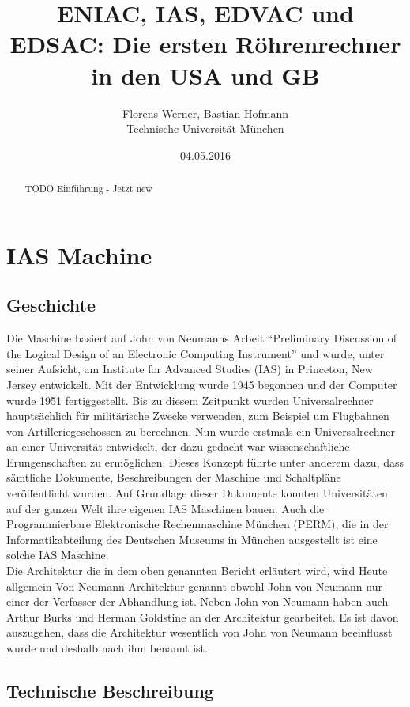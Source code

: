 \documentclass[12pt]{report}
\author{Florens Werner, Bastian Hofmann \\ Technische Universität München}
\title{ENIAC, IAS, EDVAC und EDSAC: Die ersten Röhrenrechner in den USA und GB}
\date{04.05.2016}
\begin{document}
\maketitle

\begin{abstract}
TODO Einführung - Jetzt new
\end{abstract}

\section{IAS Machine}

\subsection{Geschichte}


Die Maschine basiert auf John von Neumanns Arbeit ``Preliminary Discussion of the
Logical Design of an Electronic Computing Instrument'' und wurde, unter seiner Aufsicht, 
am Institute for Advanced Studies (IAS) in Princeton, New Jersey entwickelt.
Mit der Entwicklung wurde 1945 begonnen und der Computer wurde 1951 fertiggestellt.
Bis zu diesem Zeitpunkt wurden Universalrechner hauptsächlich für militärische Zwecke verwenden,
zum Beispiel um Flugbahnen von Artilleriegeschossen zu berechnen.
Nun wurde erstmals ein Universalrechner an einer Universität entwickelt, der dazu gedacht war
wissenschaftliche Erungenschaften zu ermöglichen.
Dieses Konzept führte unter anderem dazu, dass sämtliche Dokumente, Beschreibungen der Maschine und Schaltpläne veröffentlicht
wurden. Auf Grundlage dieser Dokumente konnten Universitäten auf der ganzen Welt ihre eigenen IAS Maschinen
bauen. Auch die Programmierbare Elektronische Rechenmaschine München (PERM), die in der Informatikabteilung des Deutschen Museums 
in München ausgestellt ist eine solche IAS Maschine.\\

Die Architektur die in dem oben genannten Bericht erläutert wird, wird Heute allgemein 
Von-Neumann-Architektur genannt obwohl John von Neumann nur einer der Verfasser der Abhandlung ist.
Neben John von Neumann haben auch Arthur Burks und Herman Goldstine an der Architektur gearbeitet. 
Es ist davon auszugehen, dass die Architektur wesentlich von John von Neumann 
beeinflusst wurde und deshalb nach ihm benannt ist.

\subsection{Technische Beschreibung}
\end{document}
